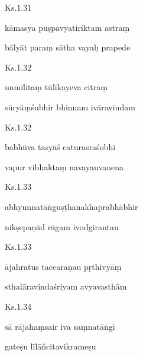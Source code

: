\documentclass{tufte-handout}
\newenvironment{sanskrit}%
{\begin{otherlanguage}{sanskrit-devanagari}}%
{\end{otherlanguage}}
\begin{document}
    
	\begin{sanskrit}
	
	    
		Ks.1.31 
    
	    
		kāmasya puṣpavyatiriktam astraṃ 
    
	    
		bālyāt paraṃ sātha vayaḥ prapede 
    
	\end{sanskrit}

    
	\begin{sanskrit}
	
	    
		Ks.1.32 
    
	    
		unmīlitaṃ tūlikayeva citraṃ 
    
	    
		sūryāṃśubhir bhinnam ivāravindam 
    
	\end{sanskrit}

    
	\begin{sanskrit}
	
	    
		Ks.1.32 
    
	    
		babhūva tasyāś caturasraśobhi 
    
	    
		vapur vibhaktaṃ navayauvanena 
    
	\end{sanskrit}

    
	\begin{sanskrit}
	
	    
		Ks.1.33 
    
	    
		abhyunnatāṅguṣṭhanakhaprabhābhir 
    
	    
		nikṣepaṇād rāgam ivodgirantau 
    
	\end{sanskrit}

    
	\begin{sanskrit}
	
	    
		Ks.1.33 
    
	    
		ājahratus taccaraṇau pṛthivyāṃ 
    
	    
		sthalāravindaśriyam avyavasthām 
    
	\end{sanskrit}

    
	\begin{sanskrit}
	
	    
		Ks.1.34 
    
	    
		sā rājahaṃsair iva saṃnatāṅgī 
    
	    
		gateṣu līlāñcitavikrameṣu 
    
	\end{sanskrit}
\end{document}
